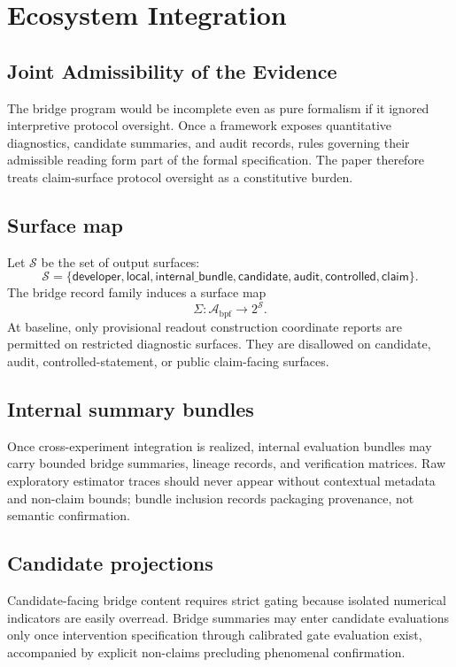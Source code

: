 \documentclass[11pt,a4paper]{article}
\theoremstyle{definition}
\newcommand{\BridgeArtifacts}{\mathcal{A}_{\mathrm{bpf}}}
\newcommand{\SurfaceMap}{\Sigma}
\begin{document}
\section{Ecosystem Integration}
\subsection{Joint Admissibility of the Evidence}
The bridge program would be incomplete even as pure formalism if it ignored interpretive protocol oversight. Once a framework exposes quantitative diagnostics, candidate summaries, and audit records, rules governing their admissible reading form part of the formal specification. The paper therefore treats claim-surface protocol oversight as a constitutive burden.

\subsection{Surface map}
Let $\mathcal{S}$ be the set of output surfaces:
\[
\mathcal{S}=
\{
\mathsf{developer},
\mathsf{local},
\mathsf{internal\_bundle},
\mathsf{candidate},
\mathsf{audit},
\mathsf{controlled},
\mathsf{claim}
\}.
\]
The bridge record family induces a surface map
\[
\SurfaceMap:\BridgeArtifacts\to 2^{\mathcal{S}}.
\]
At baseline, only provisional readout construction coordinate reports are permitted on restricted diagnostic surfaces. They are disallowed on candidate, audit, controlled-statement, or public claim-facing surfaces.

\subsection{Internal summary bundles}
Once cross-experiment integration is realized, internal evaluation bundles may carry bounded bridge summaries, lineage records, and verification matrices. Raw exploratory estimator traces should never appear without contextual metadata and non-claim bounds; bundle inclusion records packaging provenance, not semantic confirmation.

\subsection{Candidate projections}
Candidate-facing bridge content requires strict gating because isolated numerical indicators are easily overread. Bridge summaries may enter candidate evaluations only once intervention specification through calibrated gate evaluation exist, accompanied by explicit non-claims precluding phenomenal confirmation.
\end{document}

